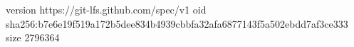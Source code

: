version https://git-lfs.github.com/spec/v1
oid sha256:b7e6e19f519a172b5dee834b4939cbbfa32afa6877143f5a502ebdd7af3ce333
size 2796364
